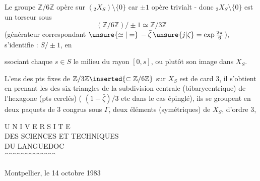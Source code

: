 

Le groupe $\mathbb Z/6\mathbb Z$ opère  sur $({}_2X_S)\setminus\{0\}$ car $\pm1$ opère trivialt - donc ${}_2X_S\setminus\{0\}$ est un torseur sous
\[
(\mathbb Z/6\mathbb Z)/\pm1\simeq\mathbb Z/3\mathbb Z
\]
 (générateur correspondant $\unsure{\simeq|=}\,-\bar\zeta\,\unsure{j|\zeta}=\exp\frac{2\pi}{6}$),
  s'identifie : $S/\pm1$, en
ssociant  chaque $s\in S$ le milieu du rayon $[0,s]$, ou plutôt son image dans\inserted{)} $X_S$.

L'ens des pts fixes de $\mathbb Z/3\mathbb Z\inserted{\subset\mathbb Z/6\mathbb Z}$ sur $X_S$ est de card 3, il s'obtient en prenant les  des six triangles de la subdivision centrale (bibarycentrique) de l'hexagone (pts cerclés) ( $(1-\bar\zeta)/3$ etc dans le cas épinglé), ils se groupent en deux paquets de 3  congrus sous $\Gamma$,  deux éléments (symétriques) de $X_S$, d'ordre 3,



\noindent\begin{minipage}[t]{0.43\textwidth}
\centering
U N I V E R S I T E\\
DES SCIENCES ET TECHNIQUES\\
DU LANGUEDOC\\
\textasciicircum\textasciicircum\textasciicircum\textasciicircum\textasciicircum\textasciicircum\textasciicircum\textasciicircum\textasciicircum\textasciicircum\textasciicircum\textasciicircum\textasciicircum
\end{minipage}\hfill
\begin{minipage}[t]{0.49\textwidth}
\raggedleft
\vspace{\baselineskip}
Montpellier, le 14 octobre 1983
\end{minipage}

